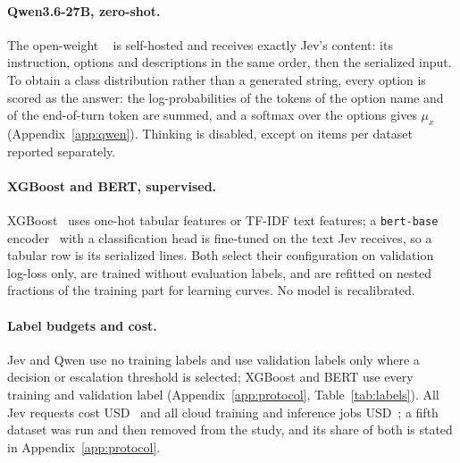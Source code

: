 \paragraph{Qwen3.6-27B, zero-shot.}
The open-weight \texttt{\QwenModelId}~\citep{qwen36} is self-hosted and receives exactly Jev's
content: its instruction, options and descriptions in the same order, then the serialized input.
To obtain a class distribution rather than a generated string, every option is scored as the
answer: the log-probabilities of the tokens of the option name and of the end-of-turn token are
summed, and a softmax over the options gives $\mu_x$ (Appendix~\ref{app:qwen}). Thinking is
disabled, except on \ThinkSubsampleN{} items per dataset reported separately.

\paragraph{XGBoost and BERT, supervised.}
XGBoost~\citep{chen2016xgboost} uses one-hot tabular features or TF-IDF text features; a
\texttt{bert-base} encoder~\citep{devlin2019bert} with a classification head is fine-tuned on the
text Jev receives, so a tabular row is its serialized lines. Both select their configuration on
validation log-loss only, are trained without evaluation labels, and are refitted on nested
fractions of the training part for learning curves. No model is recalibrated.

\paragraph{Label budgets and cost.}
Jev and Qwen use no training labels and use validation labels only where a decision or escalation
threshold is selected; XGBoost and BERT use every training and validation label
(Appendix~\ref{app:protocol}, Table~\ref{tab:labels}). All Jev requests cost USD~\JevCostUSD{}
and all cloud training and inference jobs USD~\AwsCostTotalUSD; a fifth dataset was run and then
removed from the study, and its share of both is stated in Appendix~\ref{app:protocol}.

